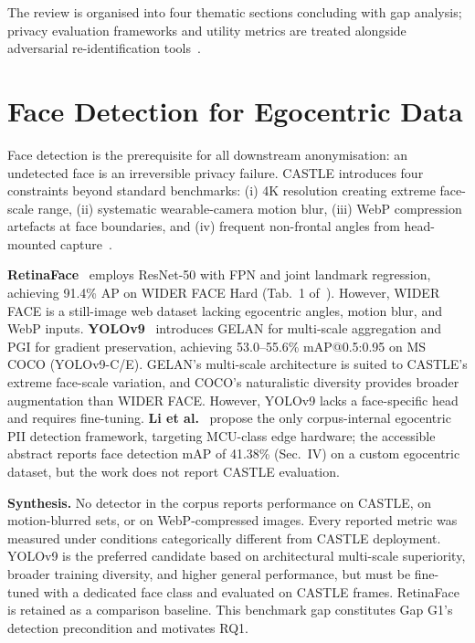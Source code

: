 \documentclass[10pt, twocolumn]{IEEEtran}
\begin{document}
The review is organised into four thematic sections concluding with gap analysis; privacy evaluation frameworks and utility metrics are treated alongside adversarial re-identification tools~\cite{li2025egoprivacy,kim2022adaface,deng2019arcface}.

\section{Face Detection for Egocentric Data}
\label{sec:facedetection}

Face detection is the prerequisite for all downstream anonymisation: an undetected face is an irreversible privacy failure. CASTLE introduces four constraints beyond standard benchmarks: (i) 4K resolution creating extreme face-scale range, (ii) systematic wearable-camera motion blur, (iii) WebP compression artefacts at face boundaries, and (iv) frequent non-frontal angles from head-mounted capture~\cite{rossetto2025castle}.

\textbf{RetinaFace}~\cite{deng2020retinaface} employs ResNet-50 with FPN and joint landmark regression, achieving 91.4\% AP on WIDER FACE Hard (Tab.~1 of~\cite{deng2020retinaface}). However, WIDER FACE is a still-image web dataset lacking egocentric angles, motion blur, and WebP inputs. \textbf{YOLOv9}~\cite{wang2024yolov9} introduces GELAN for multi-scale aggregation and PGI for gradient preservation, achieving 53.0--55.6\% mAP@0.5:0.95 on MS COCO (YOLOv9-C/E). GELAN's multi-scale architecture is suited to CASTLE's extreme face-scale variation, and COCO's naturalistic diversity provides broader augmentation than WIDER FACE. However, YOLOv9 lacks a face-specific head and requires fine-tuning. \textbf{Li et al.}~\cite{li2025lightweight} propose the only corpus-internal egocentric PII detection framework, targeting MCU-class edge hardware; the accessible abstract reports face detection mAP of 41.38\% (Sec.~IV) on a custom egocentric dataset, but the work does not report CASTLE evaluation.

\textbf{Synthesis.} No detector in the corpus reports performance on CASTLE, on motion-blurred sets, or on WebP-compressed images. Every reported metric was measured under conditions categorically different from CASTLE deployment. YOLOv9 is the preferred candidate based on architectural multi-scale superiority, broader training diversity, and higher general performance, but must be fine-tuned with a dedicated face class and evaluated on CASTLE frames. RetinaFace is retained as a comparison baseline. This benchmark gap constitutes Gap G1's detection precondition and motivates RQ1.
\end{document}
